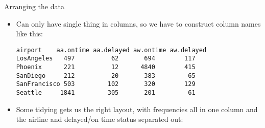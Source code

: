 \begin{frame}[fragile]{Arranging the data}
  
  \begin{itemize}
  \item Can only have single thing in columns, so we have to construct
    column names like this:
    
\begin{verbatim}
airport    aa.ontime aa.delayed aw.ontime aw.delayed
LosAngeles   497          62       694        117
Phoenix      221          12      4840        415
SanDiego     212          20       383         65
SanFrancisco 503         102       320        129
Seattle     1841         305       201         61
\end{verbatim}
  \item Some tidying gets us the right layout, with frequencies all in
    one column and the airline and delayed/on time status separated out:
    
\begin{knitrout}
\color{fgcolor}
\end{knitrout}
  \end{itemize}
  
\end{frame}


